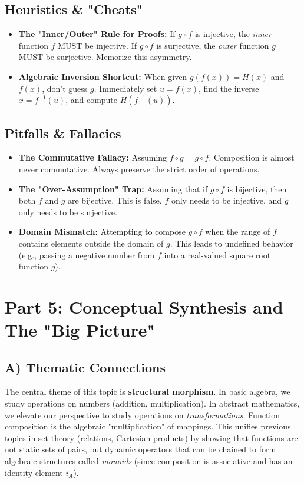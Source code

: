 \documentclass[11pt, a4paper]{article}
\theoremstyle{definition}
\theoremstyle{remark}
\begin{document}
\subsection{Heuristics \& "Cheats"}
\begin{itemize}
    \item \textbf{The "Inner/Outer" Rule for Proofs:} If $g \circ f$ is injective, the \textit{inner} function $f$ MUST be injective. If $g \circ f$ is surjective, the \textit{outer} function $g$ MUST be surjective. Memorize this asymmetry.
    \item \textbf{Algebraic Inversion Shortcut:} When given $g(f(x)) = H(x)$ and $f(x)$, don't guess $g$. Immediately set $u = f(x)$, find the inverse $x = f^{-1}(u)$, and compute $H(f^{-1}(u))$.
\end{itemize}

\subsection{Pitfalls \& Fallacies}
\begin{itemize}
    \item \textbf{The Commutative Fallacy:} Assuming $f \circ g = g \circ f$. Composition is almost never commutative. Always preserve the strict order of operations.
    \item \textbf{The "Over-Assumption" Trap:} Assuming that if $g \circ f$ is bijective, then both $f$ and $g$ are bijective. This is false. $f$ only needs to be injective, and $g$ only needs to be surjective.
    \item \textbf{Domain Mismatch:} Attempting to compose $g \circ f$ when the range of $f$ contains elements outside the domain of $g$. This leads to undefined behavior (e.g., passing a negative number from $f$ into a real-valued square root function $g$).
\end{itemize}

\section{Part 5: Conceptual Synthesis and The "Big Picture"}

\subsection{A) Thematic Connections}
The central theme of this topic is \textbf{structural morphism}. In basic algebra, we study operations on numbers (addition, multiplication). In abstract mathematics, we elevate our perspective to study operations on \textit{transformations}. Function composition is the algebraic "multiplication" of mappings. This unifies previous topics in set theory (relations, Cartesian products) by showing that functions are not static sets of pairs, but dynamic operators that can be chained to form algebraic structures called \textit{monoids} (since composition is associative and has an identity element $i_A$).
\end{document}
